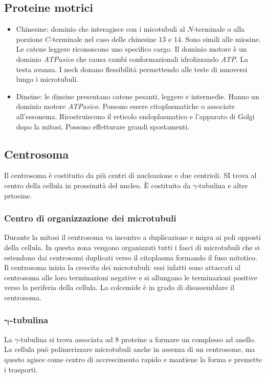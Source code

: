 	\subsection{Proteine motrici}
	\begin{multicols}{2}
		\begin{itemize}
			\item Chinesine: dominio che interagisce con i micotubuli al $N$-terminale o alla porzione $C$-terminale nel caso delle chinesine $13$ e $14$.
				Sono simili alle miosine.
				Le catene leggere riconoscono uno specifico cargo.
				Il dominio motore \`e un dominio \emph{ATPasico} che causa cambi conformazionali idrolizzando \emph{ATP}.
				La testa avanza.
				I neck donano flessibilit\`a permettendo alle teste di muoversi lungo i microtubuli.
			\item Dineine: le dineine presentano catene pesanti, leggere e intermedie.
				Hanno un dominio motore \emph{ATPasico}.
				Possono essere citoplasmatiche o associate all'essonema.
				Ricostruiscono il reticolo endoplasmatico e l'apparato di Golgi dopo la mitosi.
				Possono effetturare grandi spostamenti.
		\end{itemize}
	\end{multicols}

	\subsection{Centrosoma}
	Il centrosoma \`e costituito da pi\`u centri di nucleazione e due centrioli.
	SI trova al centro della cellula in prossimit\`a del nucleo.
	\`E costituito da $\gamma$-tubulina e altre prtoeine.

		\subsubsection{Centro di organizzazione dei microtubuli}
		Durante la mitosi il centrosoma va incontro a duplicazione e migra ai poli opposti della cellula.
		In questa zona vengono organizzati tutti i fasci di microtubuli che si estendono dai centrosomi duplicati verso il citoplasma formando il fuso mitotico.
		Il centrosoma inizia la crescita dei microtubuli: essi infatti sono attaccati al centrosoma alle loro terminazioni negative e si allungano le terminazioni positive verso la periferia della cellula.
		La colcemide \`e in grado di disassemblare il centrosoma.

		\subsubsection{$\mathbf{\gamma}$-tubulina}
		La $\gamma$-tubulina si trova associata ad $8$ proteine a formare un complesso ad anello.
		La cellula pu\`o polimerizzare microtubuli anche in assenza di un centrosome, ma questo agisce come centro di accrescimento rapido e mantiene la forma e premette i trasporti.

